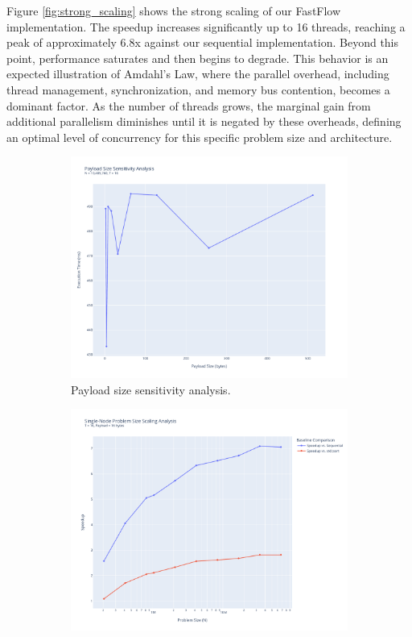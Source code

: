 \documentclass[10pt]{article}
\begin{document}
Figure \ref{fig:strong_scaling} shows the strong scaling of our FastFlow implementation. The speedup increases significantly up to 16 threads, reaching a peak of approximately 6.8x against our sequential implementation. Beyond this point, performance saturates and then begins to degrade. This behavior is an expected illustration of Amdahl's Law, where the parallel overhead, including thread management, synchronization, and memory bus contention, becomes a dominant factor. As the number of threads grows, the marginal gain from additional parallelism diminishes until it is negated by these overheads, defining an optimal level of concurrency for this specific problem size and architecture.

\begin{figure}[H]
    \centering
    \begin{subfigure}{0.49\textwidth}
        \includegraphics[width=\linewidth]{../python/plots/payload_scaling.pdf}
        \caption{Payload size sensitivity analysis.}
        \label{fig:payload_scaling}
    \end{subfigure}
    \hfill
    \begin{subfigure}{0.49\textwidth}
        \includegraphics[width=\linewidth]{../python/plots/weak_scaling.pdf} %

\end{subfigure}
\end{figure}
\end{document}
